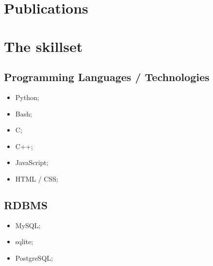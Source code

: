 \documentclass[12pt,a4paper,sans]{moderncv} %
\begin{document}


\section{Publications}



\section{The skillset}

\subsection{Programming Languages / Technologies}
\begin{multicols}{3}
\begin{itemize}
\item Python; \item Bash; \item C; 
\item C++; \item JavaScript; \item HTML / CSS;
\end{itemize}
\end{multicols}
\subsection{RDBMS}
\begin{multicols}{3}
\begin{itemize}
\item MySQL; \item sqlite; \item PostgreSQL;
\end{itemize}
\end{multicols}
\end{document}
